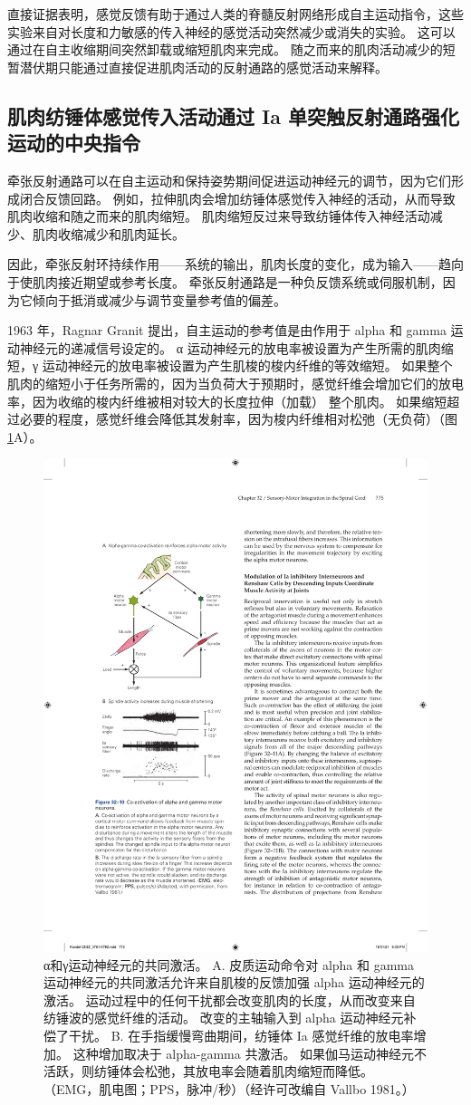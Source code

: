 直接证据表明，感觉反馈有助于通过人类的脊髓反射网络形成自主运动指令，这些实验来自对长度和力敏感的传入神经的感觉活动突然减少或消失的实验。 这可以通过在自主收缩期间突然卸载或缩短肌肉来完成。 随之而来的肌肉活动减少的短暂潜伏期只能通过直接促进肌肉活动的反射通路的感觉活动来解释。

\subsection{肌肉纺锤体感觉传入活动通过 Ia 单突触反射通路强化运动的中央指令}
牵张反射通路可以在自主运动和保持姿势期间促进运动神经元的调节，因为它们形成闭合反馈回路。 例如，拉伸肌肉会增加纺锤体感觉传入神经的活动，从而导致肌肉收缩和随之而来的肌肉缩短。 肌肉缩短反过来导致纺锤体传入神经活动减少、肌肉收缩减少和肌肉延长。

因此，牵张反射环持续作用——系统的输出，肌肉长度的变化，成为输入——趋向于使肌肉接近期望或参考长度。 牵张反射通路是一种负反馈系统或伺服机制，因为它倾向于抵消或减少与调节变量参考值的偏差。

1963 年，Ragnar Granit 提出，自主运动的参考值是由作用于 alpha 和 gamma 运动神经元的递减信号设定的。 α 运动神经元的放电率被设置为产生所需的肌肉缩短，γ 运动神经元的放电率被设置为产生肌梭的梭内纤维的等效缩短。 如果整个肌肉的缩短小于任务所需的，因为当负荷大于预期时，感觉纤维会增加它们的放电率，因为收缩的梭内纤维被相对较大的长度拉伸（加载） 整个肌肉。 
如果缩短超过必要的程度，感觉纤维会降低其发射率，因为梭内纤维相对松弛（无负荷）（图 \ref{fig:32_10}A）。

\begin{figure}[htbp]
	\centering
	\includegraphics[width=0.5\linewidth]{chap32/fig_32_10}
	\caption{α和γ运动神经元的共同激活。 A. 皮质运动命令对 alpha 和 gamma 运动神经元的共同激活允许来自肌梭的反馈加强 alpha 运动神经元的激活。 运动过程中的任何干扰都会改变肌肉的长度，从而改变来自纺锤波的感觉纤维的活动。 改变的主轴输入到 alpha 运动神经元补偿了干扰。 B. 在手指缓慢弯曲期间，纺锤体 Ia 感觉纤维的放电率增加。 这种增加取决于 alpha-gamma 共激活。 如果伽马运动神经元不活跃，则纺锤体会松弛，其放电率会随着肌肉缩短而降低。 （EMG，肌电图；PPS，脉冲/秒）（经许可改编自 Vallbo 1981。）}
	\label{fig:32_10}
\end{figure}

